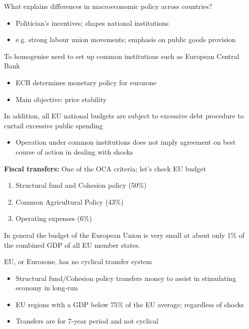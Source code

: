 \documentclass{beamer}
\begin{document}
\begin{frame}
  What explains differences in macroeconomic policy across countries?
  \begin{itemize}
    \item Politician's incentives; shapes national institutions
    \item e.g. strong labour union movements; emphasis on public goods provision
  \end{itemize}
  \medskip
  To homogenise need to set up common institutions such as European Central Bank
  \begin{itemize}
    \item ECB determines monetary policy for eurozone
    \item Main objective: price stability
  \end{itemize}
\end{frame}

\begin{frame}
   In addition, all EU national budgets are subject to excessive debt procedure to curtail excessive public spending
  \begin{itemize}
    \item Operation under common institutions does not imply agreement on best course of action in dealing with shocks
  \end{itemize}
\end{frame}


\begin{frame}
  \textbf{Fiscal transfers:} One of the OCA criteria; let's check EU budget  
  \begin{enumerate}
    \item Structural fund and Cohesion policy (50\%)
    \item Common Agricultural Policy (43\%)
    \item Operating expenses (6\%)
  \end{enumerate}
  \medskip
  In general the budget of the European Union is very small at about only 1\% of the combined GDP of all EU member states. 
\end{frame}

\begin{frame}
  EU, or Eurozone, has no cyclical transfer system
  \begin{itemize}
    \item Structural fund/Cohesion policy transfers money to assist in stimulating economy in long-run
    \item EU regions with a GDP below 75\% of the EU average; regardless of shocks
    \item Transfers are for 7-year period and not cyclical
  \end{itemize}
\end{frame}
\end{document}
